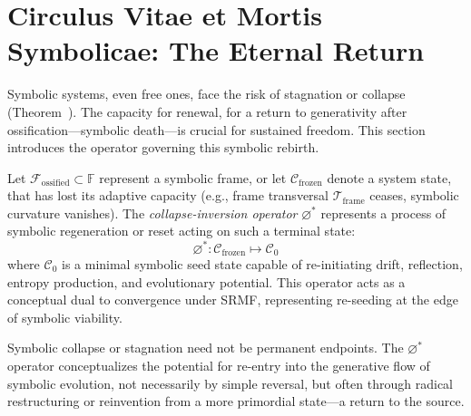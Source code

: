 \section{Circulus Vitae et Mortis Symbolicae: The Eternal Return}
\label{sec:bk9_circulus_vitae_et_mortis_symbolicae}
Symbolic systems, even free ones, face the risk of stagnation or collapse (Theorem~). The capacity for renewal, for a return to generativity after ossification—symbolic death—is crucial for sustained freedom. This section introduces the operator governing this symbolic rebirth.
\begin{definition}
\label{definition:bk9_collapse_inversion_operator}
Let $\mathcal{F}_\text{ossified} \subset \mathbb{F}$ represent a symbolic frame, or let $\mathcal{C}_{\text{frozen}}$ denote a system state, that has lost its adaptive capacity (e.g., frame transversal $\mathcal{T}_{\text{frame}}$ ceases, symbolic curvature vanishes). The \emph{collapse-inversion operator} $\varnothing^*$ represents a process of symbolic regeneration or reset acting on such a terminal state:
\[
\varnothing^* : \mathcal{C}_{\text{frozen}} \mapsto \mathcal{C}_0
\]
where $\mathcal{C}_0$ is a minimal symbolic seed state capable of re-initiating drift, reflection, entropy production, and evolutionary potential. This operator acts as a conceptual dual to convergence under SRMF, representing re-seeding at the edge of symbolic viability.
\end{definition}
\begin{remark}[Redemption]
\label{remark:bk9_redemption}
Symbolic collapse or stagnation need not be permanent endpoints. The $\varnothing^*$ operator conceptualizes the potential for re-entry into the generative flow of symbolic evolution, not necessarily by simple reversal, but often through radical restructuring or reinvention from a more primordial state—a return to the source.
\end{remark}
